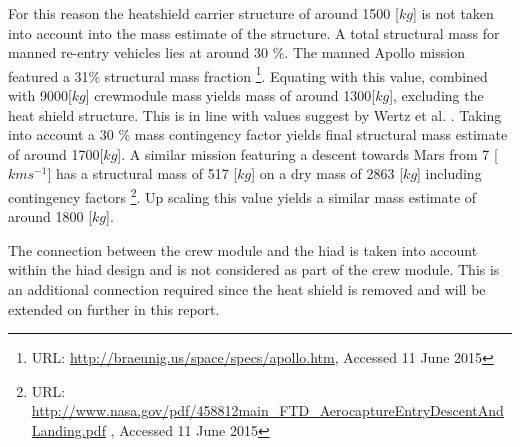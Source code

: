 For this reason the heatshield carrier structure of around 1500 [$kg$] \cite{Ainsworth2014} is not taken into account into the mass estimate of the structure. A total structural mass for manned re-entry vehicles lies at around 30 \%. The manned Apollo mission featured a 31\% structural mass fraction \footnote{URL: \url{http://braeunig.us/space/specs/apollo.htm}, Accessed 11 June 2015}. Equating with this value, combined with 9000[$kg$] crewmodule mass yields mass of around 1300[$kg$], excluding the heat shield structure. This is in line with values suggest by Wertz et al. \cite{Wertz2011}. Taking into account a 30 \% mass contingency factor yields final structural mass estimate of around 1700[$kg$]. A similar mission featuring a descent towards Mars from 7 [$kms^{-1}$] has a structural mass of 517 [$kg$] on a dry mass of 2863 [$kg$] including contingency factors \footnote{URL: \url{http://www.nasa.gov/pdf/458812main\_FTD\_AerocaptureEntryDescentAndLanding.pdf} , Accessed 11 June 2015 }. Up scaling this value yields a similar mass estimate of around 1800 [$kg$].

The connection between the crew module and the \gls{hiad} is taken into account within the \gls{hiad} design and is not considered as part of the crew module. This is an additional connection required since the heat shield is removed and will be extended on further in this report.



